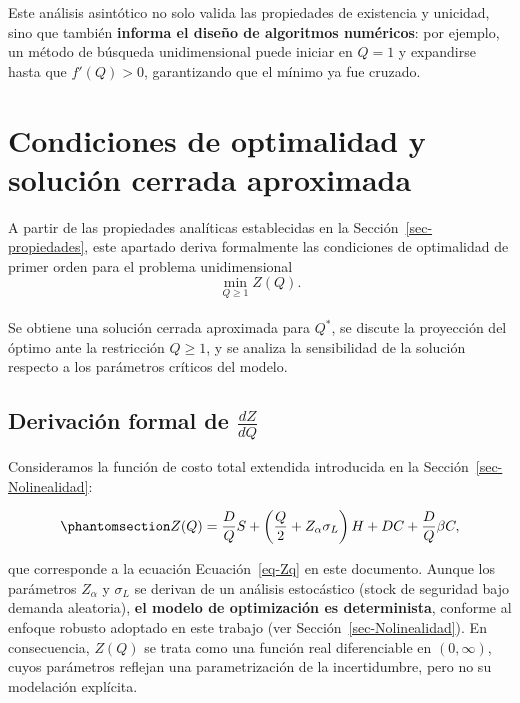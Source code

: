 \documentclass[
  spanish,
  us-letterpaper,
]{scrreprt}
\numberwithin{equation}{section}
\begin{document}
Este análisis asintótico no solo valida las propiedades de existencia y
unicidad, sino que también \textbf{informa el diseño de algoritmos
numéricos}: por ejemplo, un método de búsqueda unidimensional puede
iniciar en \(Q = 1\) y expandirse hasta que \(f'(Q) > 0\), garantizando
que el mínimo ya fue cruzado.

\section{Condiciones de optimalidad y solución cerrada
aproximada}\label{condiciones-de-optimalidad-y-soluciuxf3n-cerrada-aproximada}

A partir de las propiedades analíticas establecidas en la
Sección~\ref{sec-propiedades}, este apartado deriva formalmente las
condiciones de optimalidad de primer orden para el problema
unidimensional\\
\[
\min_{Q \geq 1} Z(Q).
\]\\
Se obtiene una solución cerrada aproximada para \(Q^*\), se discute la
proyección del óptimo ante la restricción \(Q \geq 1\), y se analiza la
sensibilidad de la solución respecto a los parámetros críticos del
modelo.

\subsection{\texorpdfstring{Derivación formal de
\(\frac{dZ}{dQ}\)}{Derivación formal de \textbackslash frac\{dZ\}\{dQ\}}}\label{sec-derivacion}

Consideramos la función de costo total extendida introducida en la
Sección~\ref{sec-Nolinealidad}:

\begin{equation}\phantomsection\label{eq-ZQ_extendida}{
Z(Q) = \frac{D}{Q} S + \left( \frac{Q}{2} + Z_\alpha \sigma_L \right) H + D C + \frac{D}{Q} \beta C,
}\end{equation}

que corresponde a la ecuación Ecuación~\ref{eq-Zq} en este documento.
Aunque los parámetros \(Z_\alpha\) y \(\sigma_L\) se derivan de un
análisis estocástico (stock de seguridad bajo demanda aleatoria),
\textbf{el modelo de optimización es determinista}, conforme al enfoque
robusto adoptado en este trabajo (ver Sección~\ref{sec-Nolinealidad}).
En consecuencia, \(Z(Q)\) se trata como una función real diferenciable
en \((0,\infty)\), cuyos parámetros reflejan una parametrización de la
incertidumbre, pero no su modelación explícita.
\end{document}
